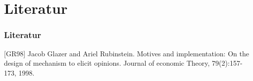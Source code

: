 \documentclass{beamer}
\begin{document}
\section{Literatur}
\begin{frame}
\frametitle{Literatur}
\footnotesize{
\begin{thebibliography}{99}
 [GR98] Jacob Glazer and Ariel Rubinstein. Motives and implementation: On the design of mechanism to elicit opinions. Journal of economic Theory, 79(2):157-173, 1998.
\end{thebibliography}
}
\end{frame}
\end{document}
